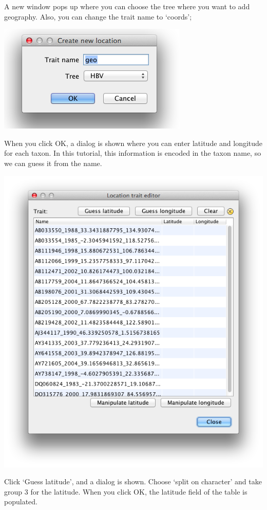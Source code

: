 \documentclass{article}
\begin{document}
A new window pops up where you can choose the tree where you want to add geography.
Also, you can change the trait name to `coords';

\includegraphics[scale=0.4,clip=true,trim=300 200 300 200]{figures/BEAUti_geography2.png}

When you click OK, a dialog is shown where you can enter latitude and longitude for each taxon.
In this tutorial, this information is encoded in the taxon name, so we can guess it from the name. 

\includegraphics[scale=0.4]{figures/BEAUti_geography3.png}

Click `Guess latitude', and a dialog is shown. Choose `split on character' and take group 3 for the latitude.
When you click OK, the latitude field of the table is populated.
\end{document}

